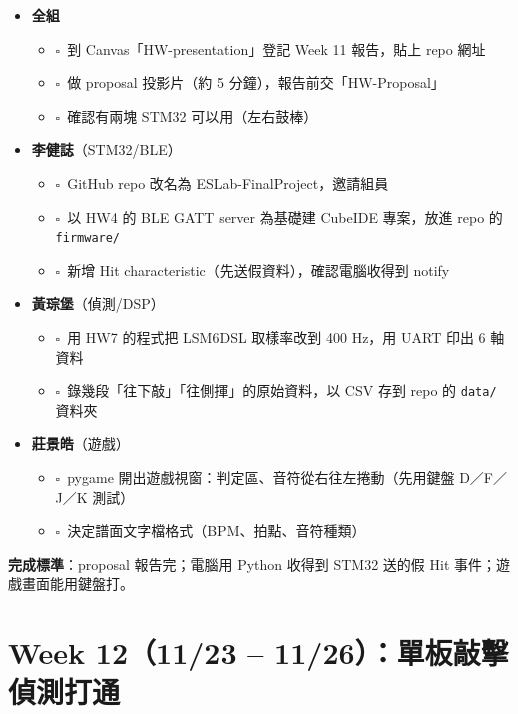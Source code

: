 \documentclass[11pt]{article}
\newcommand{\todo}{$\square$\ }
\newcommand{\who}[1]{\textbf{#1}}
\begin{document}
\begin{itemize}[label={}]
  \item \who{全組}
  \begin{itemize}[label={}]
    \item \todo 到 Canvas「HW-presentation」登記 Week 11 報告，貼上 repo 網址
    \item \todo 做 proposal 投影片（約 5 分鐘），報告前交「HW-Proposal」
    \item \todo 確認有兩塊 STM32 可以用（左右鼓棒）
  \end{itemize}
  \item \who{李健誌}（STM32/BLE）
  \begin{itemize}[label={}]
    \item \todo GitHub repo 改名為 ESLab-FinalProject，邀請組員
    \item \todo 以 HW4 的 BLE GATT server 為基礎建 CubeIDE 專案，放進 repo 的 \texttt{firmware/}
    \item \todo 新增 Hit characteristic（先送假資料），確認電腦收得到 notify
  \end{itemize}
  \item \who{黃琮堡}（偵測/DSP）
  \begin{itemize}[label={}]
    \item \todo 用 HW7 的程式把 LSM6DSL 取樣率改到 400 Hz，用 UART 印出 6 軸資料
    \item \todo 錄幾段「往下敲」「往側揮」的原始資料，以 CSV 存到 repo 的 \texttt{data/} 資料夾
  \end{itemize}
  \item \who{莊景皓}（遊戲）
  \begin{itemize}[label={}]
    \item \todo pygame 開出遊戲視窗：判定區、音符從右往左捲動（先用鍵盤 D／F／J／K 測試）
    \item \todo 決定譜面文字檔格式（BPM、拍點、音符種類）
  \end{itemize}
\end{itemize}
\textbf{完成標準}：proposal 報告完；電腦用 Python 收得到 STM32 送的假 Hit 事件；遊戲畫面能用鍵盤打。

\section*{Week 12（11/23 -- 11/26）：單板敲擊偵測打通}
\end{document}
